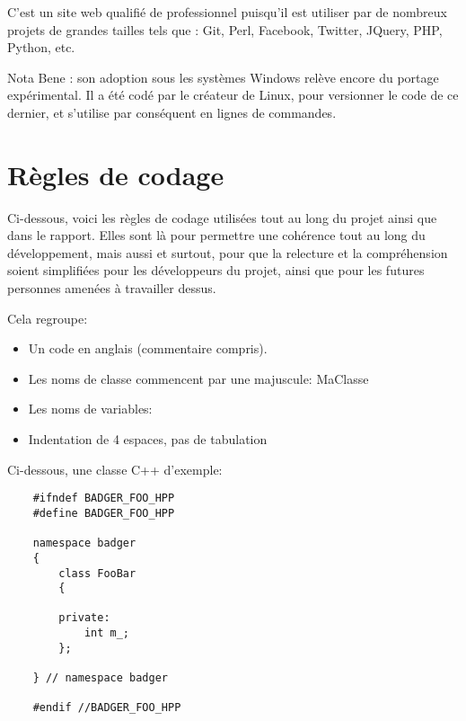     C'est un site web qualifié de professionnel puisqu'il est utiliser par de 
    nombreux projets de grandes tailles tels que : Git, Perl, Facebook, Twitter,
    JQuery, PHP, Python, etc.

    Nota Bene : son adoption sous les systèmes Windows relève encore du portage
    expérimental. Il a été codé par le créateur de Linux, pour versionner le code
    de ce dernier, et s'utilise par conséquent en lignes de commandes.







    \section{Règles de codage}
        Ci-dessous, voici les règles de codage utilisées tout au long du projet
    ainsi que dans le rapport. Elles sont là pour permettre une cohérence tout au
    long du développement, mais aussi et surtout, pour que la relecture et la 
    compréhension soient simplifiées pour les développeurs du projet, ainsi que pour les
    futures personnes amenées à travailler dessus.

    Cela regroupe:
    \begin{itemize}
    \item Un code en anglais (commentaire compris).
    \item Les noms de classe commencent par une majuscule: MaClasse
    \item Les noms de variables: 
    \item Indentation de 4 espaces, pas de tabulation
    \end{itemize}

    Ci-dessous, une classe C++ d'exemple:

    \begin{lstlisting}
    #ifndef BADGER_FOO_HPP
    #define BADGER_FOO_HPP

    namespace badger
    {
        class FooBar
        {

        private:
            int m_;
        };

    } // namespace badger

    #endif //BADGER_FOO_HPP
    \end{lstlisting}




